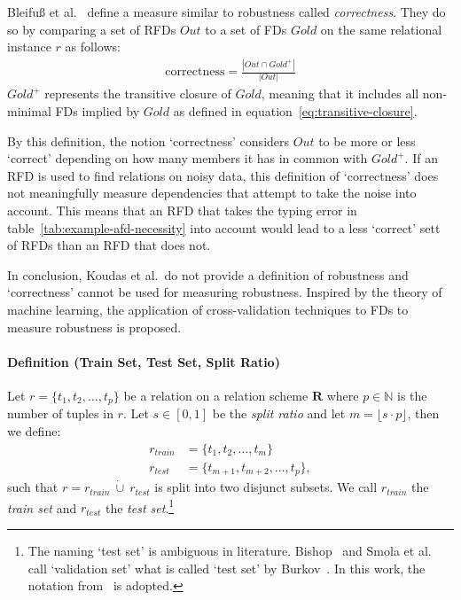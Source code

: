 Bleifuß et al.~\cite[p.~3]{BLE16} define a measure similar to robustness called \emph{correctness}.
They do so by comparing a set of RFDs \( Out \) to a set of FDs \( Gold \) on the same relational instance \( r \) as follows:
\begin{align*}
    \text{correctness} = \frac{|Out \cap Gold^{+}|}{|Out|}
\end{align*}
\( Gold^{+} \) represents the transitive closure of \( Gold \), meaning that it includes all non-minimal FDs implied by \( Gold \) as defined in equation~\ref{eq:transitive-closure}.

By this definition, the notion `correctness' considers \( Out \) to be more or less `correct' depending on how many members it has in common with \( Gold^{+} \).
If an RFD is used to find relations on noisy data, this definition of `correctness' does not meaningfully measure dependencies that attempt to take the noise into account.
This means that an RFD that takes the typing error in table~\ref{tab:example-afd-necessity} into account would lead to a less `correct' sett of RFDs than an RFD that does not.

In conclusion, Koudas et al.\ do not provide a definition of robustness and `correctness' cannot be used for measuring robustness.
Inspired by the theory of machine learning, the application of cross-validation techniques to FDs to measure robustness is proposed.

\paragraph{Definition (Train Set, Test Set, Split Ratio)} Let \( r = \{ t_1, t_2, \dots, t_p \}\) be a  relation on a relation scheme \( \boldsymbol{R} \) where \( p \in \mathbb{N} \) is the number of tuples in \( r \).
Let \( s \in [0, 1] \) be the \emph{split ratio} and let \( m = \lfloor s \cdot p \rfloor \), then we define:
\begin{align}
    r_{train} &= \{ t_1, t_2, \dots, t_{m} \} \\
    r_{test} &= \{ t_{m + 1}, t_{m + 2}, \dots, t_{p} \},
\end{align}
such that \( r =  r_{train}~\dot\cup~r_{test} \) is split into two disjunct subsets.
We call \( r_{train} \) the \emph{train set} and \( r_{test} \) the \emph{test set}.\footnote{The naming `test set' is ambiguous in literature. Bishop~\cite{BIS06} and Smola et al.\ \cite{SMO08} call `validation set' what is called `test set' by Burkov~\cite[ch.~5, p.~8-9]{BUR19}. In this work, the notation from~\cite{BUR19} is adopted.}~\cite[p.~56]{SMO08}

